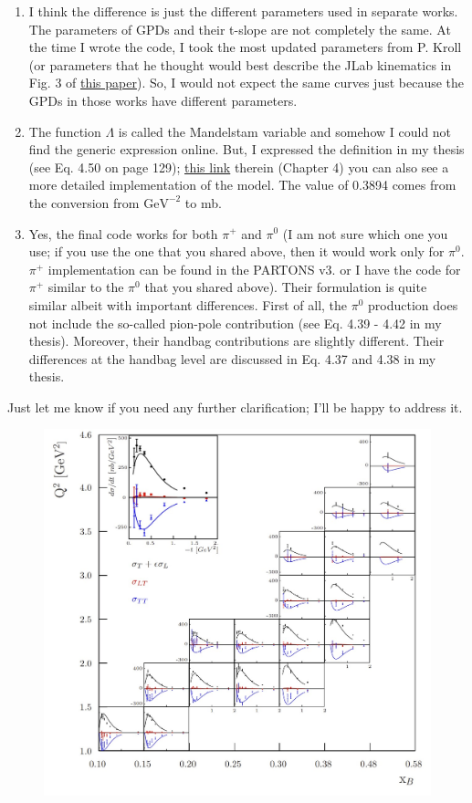     \begin{enumerate}
        \item I think the difference is just the different parameters used in separate works. The parameters of GPDs and their t-slope are not completely the same. At the time I wrote the code, I took the most updated parameters from P. Kroll (or parameters that he thought would best describe the JLab kinematics in Fig. 3 of \href{https://arxiv.org/pdf/2007.15677.pdf}{this paper}). So, I would not expect the same curves just because the GPDs in those works have different parameters.
    
        \item The function $\Lambda$ is called the Mandelstam variable and somehow I could not find the generic expression online. But, I expressed the definition in my thesis (see Eq. 4.50 on page 129); \href{https://www.osti.gov/biblio/1881460}{this link} therein (Chapter 4) you can also see a more detailed implementation of the model. The value of 0.3894 comes from the conversion from $\text{GeV}^{-2}$ to mb.
    
        \item Yes, the final code works for both $\pi^+$ and $\pi^0$ (I am not sure which one you use; if you use the one that you shared above, then it would work only for $\pi^0$. $\pi^+$ implementation can be found in the PARTONS v3. or I have the code for $\pi^+$ similar to the $\pi^0$ that you shared above). Their formulation is quite similar albeit with important differences. First of all, the $\pi^0$ production does not include the so-called pion-pole contribution (see Eq. 4.39 - 4.42 in my thesis). Moreover, their handbag contributions are slightly different. Their differences at the handbag level are discussed in Eq. 4.37 and 4.38 in my thesis.
    \end{enumerate}
    
    Just let me know if you need any further clarification; I'll be happy to address it.    
    
    
    
    
    \begin{figure}[hbt]
    	\centering
    	\includegraphics[page=6,width=0.6\linewidth]{Chapters/Ch5-Further/GK_model/pics/clas6comp.jpg}
    \end{figure}\label{fig:oldres}
    
